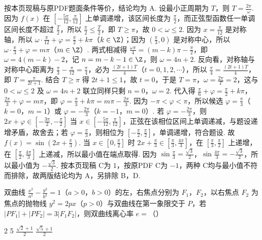 \begin{solution}
按本页现稿与原PDF题面条件等价，结论均为 A. 设最小正周期为 \(T\)，则 \(T=\frac{2\pi}{\omega}\). 因为 \(f\left( x \right)\) 在 \(\left[ -\frac{5\pi}{12},\frac{\pi}{12} \right]\) 上单调递增，该区间长度为 \(\frac{\pi}{2}\)，而正弦型函数任一单调区间长度不超过 \(\frac{T}{2}\)，所以 \(\frac{\pi}{2}\le \frac{T}{2}\)，即 \(T\ge \pi\)，故 \(0<\omega \le 2\). 因为 \(x=\frac{\pi}{12}\) 是对称轴，所以 \(\omega \cdot \frac{\pi}{12}+\varphi =\frac{\pi}{2}+k\pi\)（\(k\in \Z\)）；因为 \(\left( \frac{\pi}{3},0 \right)\) 是对称中心，所以 \(\omega \cdot \frac{\pi}{3}+\varphi =m\pi\)（\(m\in \Z\)）. 两式相减得 \(\frac{\omega \pi}{4}=\left( m-k \right)\pi -\frac{\pi}{2}\)，即 \(\omega =4\left( m-k \right)-2\)，记 \(n=m-k-1\in \Z\)，则 \(\omega =4n+2\). 反向看，对称轴与对称中心距离为 \(\frac{\pi}{3}-\frac{\pi}{12}=\frac{\pi}{4}\)，必为 \(\frac{\left( 2t+1 \right)T}{4}\)（\(t=0,1,2,\cdots\)），所以 \(\frac{\pi}{4}=\frac{\left( 2t+1 \right)T}{4}\)，即 \(T=\frac{\pi}{2t+1}\). 结合 \(T\ge \pi\) 得 \(2t+1\le 1\)，故 \(t=0\)，于是 \(T=\pi\)，\(\omega =\frac{2\pi}{T}=2\)，这与 \(0<\omega \le 2\) 及 \(\omega =4n+2\) 联立同样只剩 \(n=0\)，\(\omega =2\). 代入得 \(\frac{\pi}{6}+\varphi =\frac{\pi}{2}+k\pi\)，\(\frac{2\pi}{3}+\varphi =m\pi\)，即 \(\varphi =\frac{\pi}{3}+k\pi =m\pi -\frac{2\pi}{3}\). 因为 \(-\pi <\varphi <\pi\)，所以候选 \(\varphi =\frac{\pi}{3}\)（\(k=0\)，\(m=1\)）或 \(\varphi =-\frac{2\pi}{3}\)（\(k=-1\)，\(m=0\)）. 若 \(\varphi =-\frac{2\pi}{3}\)，则 \(2x+\varphi \in \left[ -\frac{3\pi}{2},-\frac{\pi}{2} \right]\) 当 \(x\in \left[ -\frac{5\pi}{12},\frac{\pi}{12} \right]\)，正弦在该相位区间上单调递减，与题设递增矛盾，故舍去；若 \(\varphi =\frac{\pi}{3}\)，则相位为 \(\left[ -\frac{\pi}{2},\frac{\pi}{2} \right]\)，单调递增，符合题设. 故 \(f\left( x \right)=\sin \left( 2x+\frac{\pi}{3} \right)\). 当 \(x\in \left[ 0,\frac{\pi}{2} \right]\) 时 \(2x+\frac{\pi}{3}\in \left[ \frac{\pi}{3},\frac{4\pi}{3} \right]\)，在 \(\left[ \frac{\pi}{3},\frac{\pi}{2} \right]\) 上递增，在 \(\left[ \frac{\pi}{2},\frac{4\pi}{3} \right]\) 上递减，所以最小值在端点取得. 因为 \(\sin \frac{\pi}{3}=\frac{\sqrt{3}}{2}\)，\(\sin \frac{4\pi}{3}=-\frac{\sqrt{3}}{2}\)，所以最小值为 \(-\frac{\sqrt{3}}{2}\). 按本页现稿 C为 \(1\)，按原PDF C为 \(-1\)，两种 C均与最小值不符而排除，故两版结论均为 A，另排除 B，D.
\end{solution}

\begin{problem}
双曲线 \(\frac{x^2}{a^2}-\frac{y^2}{b^2}=1\)（\(a>0\)，\(b>0\)）的左，右焦点分别为 \(F_1\)，\(F_2\)，以右焦点 \(F_2\) 为焦点的抛物线 \(y^2=2px\)（\(p>0\)）与双曲线在第一象限交于 \(P\)，若 \(|PF_1|+|PF_2|=3|F_1F_2|\)，则双曲线离心率 \(e=\)（\quad）

\choices
    {2}
    {5}
    {\(\frac{\sqrt2+1}{2}\)}
    {\(\frac{\sqrt5+1}{2}\)}
\end{problem}

